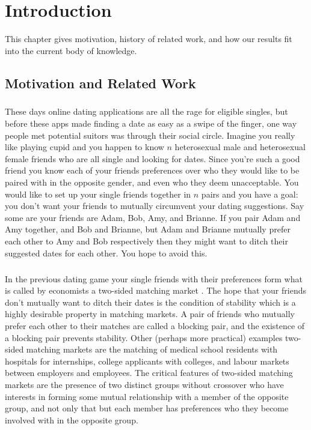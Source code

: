\chapter{Introduction}
This chapter gives motivation, history of related work, and how our results fit into the current body of knowledge.

\section{Motivation and Related Work}

\paragraph{}
These days online dating applications are all the rage for eligible singles, but before these apps made finding a date as easy as a swipe of the finger, one way people met potential suitors was through their social circle. Imagine you really like playing cupid and you happen to know $n$ heterosexual male and heterosexual female friends who are all single and looking for dates. Since you're such a good friend you know each of your friends preferences over who they would like to be paired with in the opposite gender, and even who they deem unacceptable. You would like to set up your single friends together in $n$ pairs and you have a goal: you don't want your friends to mutually circumvent your dating suggestions. Say some are your friends are Adam, Bob, Amy, and Brianne. If you pair Adam and Amy together, and Bob and Brianne, but Adam and Brianne mutually prefer each other to Amy and Bob respectively then they might want to ditch their suggested dates for each other. You hope to avoid this.
\paragraph{}
In the previous dating game your single friends with their preferences form what is called by economists a two-sided matching market \cite{roth1992two}. The hope that your friends don't mutually want to ditch their dates is the condition of stability which is a highly desirable property in matching markets. A pair of friends who mutually prefer each other to their matches are called a blocking pair, and the existence of a blocking pair prevents stability. Other (perhaps more practical) examples two-sided matching markets are the matching of medical school residents with hospitals for internships, college applicants with colleges, and labour markets between employers and employees. The critical features of two-sided matching markets are the presence of two distinct groups without crossover who have interests in forming some mutual relationship with a member of the opposite group, and not only that but each member has preferences who they become involved with in the opposite group.
